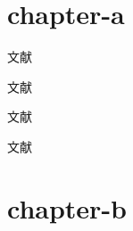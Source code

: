 \documentclass[twoside]{book}
\begin{document}
\chapter{chapter-a}


文献\cite{deverell}

文献\citep{deverell}

\citet{walls}

文献\citep{sommers}

文献\citep{walls,sommers,deverell}




\chapter{chapter-b}

\cite{walls,sommers,deverell}

\citet{wfz,wfz2}

\citep{wfz,wfz2}





    
\end{document}
